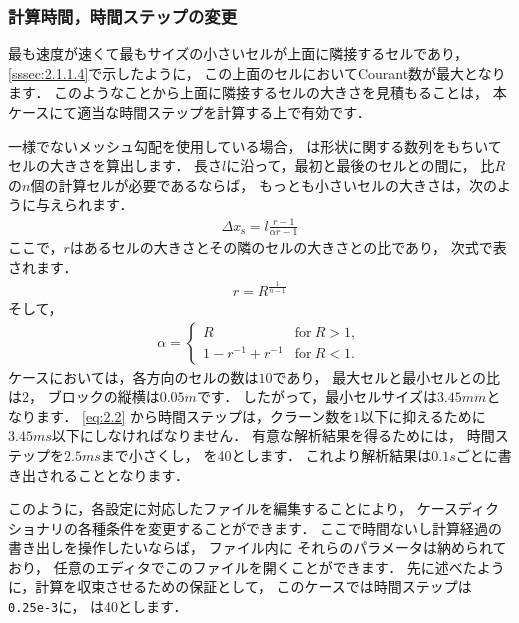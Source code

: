 \subsubsection{計算時間，時間ステップの変更}
\label{sssec:2.1.6.2}
最も速度が速くて最もサイズの小さいセルが上面に隣接するセルであり，
\autoref{sssec:2.1.1.4}で示したように，
この上面のセルにおいてCourant数が最大となります．
このようなことから上面に隣接するセルの大きさを見積もることは，
本ケースにて適当な時間ステップを計算する上で有効です．

一様でないメッシュ勾配を使用している場合，
%
%
は形状に関する数列をもちいてセルの大きさを算出します．
長さ$l$に沿って，最初と最後のセルとの間に，
比$R$の$n$個の計算セルが必要であるならば，
もっとも小さいセルの大きさは，次のように与えられます．
\begin{align}
 \label{eq:2.5}
  \Delta x_{\mathrm{s}} = l\frac{r - 1}{\alpha r - 1}
\end{align}
ここで，$r$はあるセルの大きさとその隣のセルの大きさとの比であり，
次式で表されます．
\begin{align}
 \label{eq:2.6}
  r = R^{\frac{1}{n-1}}
\end{align}
そして，
\begin{align}
 \label{eq:2.7}
  \alpha =
  \begin{cases}
   R & \text{for}\ R > 1, \\
   1 - r^{-1} + r^{-1} & \text{for}\ R < 1.
  \end{cases}
\end{align}
ケースにおいては，各方向のセルの数は$10$であり，
最大セルと最小セルとの比は$2$，
ブロックの縦横は$0.05\unit{m}$です．
したがって，最小セルサイズは$3.45\unit{mm}$となります．
\autoref{eq:2.2} から時間ステップは，クラーン数を$1$以下に抑えるために
$3.45\unit{ms}$以下にしなければなりません．
有意な解析結果を得るためには，
時間ステップを$2.5\unit{ms}$まで小さくし，
を40とします．
これより解析結果は$0.1\unit{s}$ごとに書き出されることとなります．

このように，各設定に対応したファイルを編集することにより，
ケースディクショナリの各種条件を変更することができます．
ここで時間ないし計算経過の書き出しを操作したいならば，
ファイル内に
それらのパラメータは納められており，
任意のエディタでこのファイルを開くことができます．
先に述べたように，計算を収束させるための保証として，
このケースでは時間ステップは\texttt{0.25e-3}に，
は40とします．

